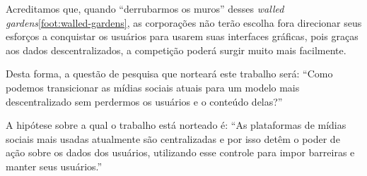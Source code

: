 Acreditamos que, quando ``derrubarmos os muros'' desses \textit{walled gardens}\ref{foot:walled-gardens}, as corporações não terão escolha fora direcionar seus esforços a conquistar os usuários para usarem suas interfaces gráficas, pois graças aos dados descentralizados, a competição poderá surgir muito mais facilmente.


Desta forma, a questão de pesquisa que norteará este trabalho será: ``Como podemos transicionar as mídias sociais atuais para um modelo mais descentralizado sem perdermos os usuários e o conteúdo delas?''

A hipótese sobre a qual o trabalho está norteado é: ``As plataformas de mídias sociais mais usadas atualmente são centralizadas e por isso detêm o poder de ação sobre os dados dos usuários, utilizando esse controle para impor barreiras e manter seus usuários.''




